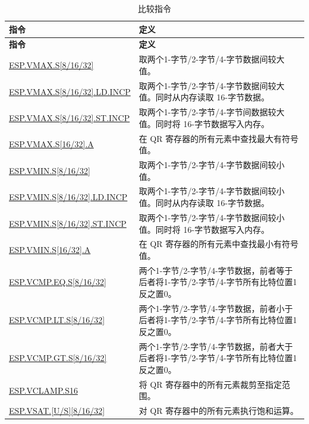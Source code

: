 \begin{longtable}[c]{|l|m{10cm}|}
    \caption{比较指令}
    \label{tab:pie-comparison-instructions}\\
    \hline
    \rowcolor{lightgray}
    \textbf{指令} & \textbf{定义} \\\hline
    \endfirsthead
    \rowcolor{lightgray}
    \textbf{指令} & \textbf{定义} \\\hline
    \endhead
    \endfoot

    \hyperref[instruction:ESPVMAXS8]{ESP.VMAX.S[8/16/32]} & 取两个1-字节/2-字节/4-字节数据间较大值。
    \\\hline
    \hyperref[instruction:ESPVMAXS8LDINCP]{ESP.VMAX.S[8/16/32].LD.INCP} & 取两个1-字节/2-字节/4-字节数据间较大值。同时从内存读取 16-字节数据。
    \\\hline
    \hyperref[instruction:ESPVMAXS8STINCP]{ESP.VMAX.S[8/16/32].ST.INCP} & 取两个1-字节/2-字节/4-字节间数据较大值。同时将 16-字节数据写入内存。
    \\\hline
    \hyperref[instruction:ESPMAXS16A]{ESP.VMAX.S[16/32].A} & 在 QR 寄存器的所有元素中查找最大有符号值。
    \\\hline
    \hyperref[instruction:ESPVMINS8]{ESP.VMIN.S[8/16/32]} & 取两个1-字节/2-字节/4-字节数据间较小值。
    \\\hline
    \hyperref[instruction:ESPVMINS8LDINCP]{ESP.VMIN.S[8/16/32].LD.INCP} & 取两个1-字节/2-字节/4-字节数据间较小值。同时从内存读取 16-字节数据。
    \\\hline
    \hyperref[instruction:ESPVMINS8STINCP]{ESP.VMIN.S[8/16/32].ST.INCP} & 取两个1-字节/2-字节/4-字节数据间较小值。同时将 16-字节数据写入内存。
    \\\hline
    \hyperref[instruction:ESPMINS16A]{ESP.VMIN.S[16/32].A} & 在 QR 寄存器的所有元素中查找最小有符号值。
    \\\hline
    \hyperref[instruction:ESPVCMPEQS8]{ESP.VCMP.EQ.S[8/16/32]} & 两个1-字节/2-字节/4-字节数据，前者等于后者将1-字节/2-字节/4-字节所有比特位置1反之置0。
    \\\hline
    \hyperref[instruction:ESPVCMPLTS8]{ESP.VCMP.LT.S[8/16/32]} & 两个1-字节/2-字节/4-字节数据，前者小于后者将1-字节/2-字节/4-字节所有比特位置1反之置0。
    \\\hline
    \hyperref[instruction:ESPVCMPGTS8]{ESP.VCMP.GT.S[8/16/32]} & 两个1-字节/2-字节/4-字节数据，前者大于后者将1-字节/2-字节/4-字节所有比特位置1反之置0。
    \\\hline
    \hyperref[instruction:ESPVCLAMPS16]{ESP.VCLAMP.S16} & 将 QR 寄存器中的所有元素裁剪至指定范围。
    \\\hline
    \hyperref[instruction:ESPVSATU8]{ESP.VSAT.[U/S][8/16/32]} & 对 QR 寄存器中的所有元素执行饱和运算。
    \\\hline
\end{longtable}